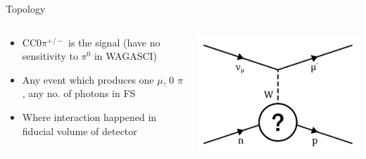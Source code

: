 \documentclass{beamer}
\begin{document}
\begin{frame}{Topology}

\begin{columns}[c]
\begin{column}{.5\textwidth}
\begin{itemize}
    \item CC0$\pi^{+/-}$ is the signal (have no sensitivity to $\pi^0$ in WAGASCI) 
    \item Any event which produces one $\mu$, 0 $\pi$, any no. of photons in FS
    \item Where interaction happened in fiducial volume of detector
\end{itemize}
\end{column}
\begin{column}{.5\textwidth}
\includegraphics[width=\textwidth]{images/topology.png}
\end{column}
\end{columns}
\end{frame}
\end{document}
